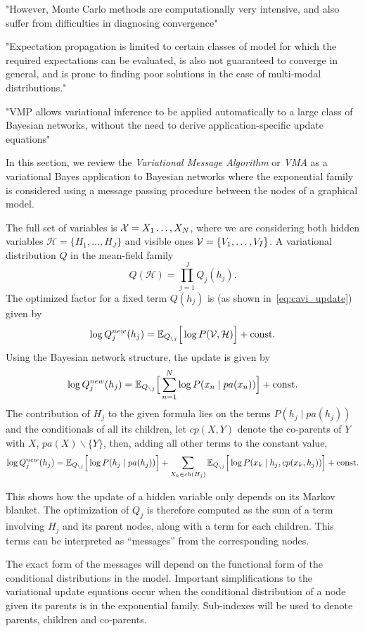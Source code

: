 
"However, Monte Carlo methods are computationally very intensive, and also suffer from difficulties in diagnosing convergence"

"Expectation propagation is limited to certain classes of model for which the required expectations can be evaluated, is also not guaranteed to converge in general, and is prone to finding poor solutions in the case of multi-modal distributions."

"VMP allows variational inference to be applied automatically to a large class of Bayesian networks, without the need to derive application-specific update equations"

In this section, we review the \emph{Variational Message Algorithm} or \emph{VMA} as a variational Bayes application to Bayesian networks where the exponential family is considered using a message passing procedure between the nodes of a graphical model. 

The full set of variables is \( \mathcal{X} = X_1\dots,X_N \), where we are considering both hidden variables \( \mathcal{H} = \{H_1,\dots,H_J\} \) and visible ones \( \mathcal{V} = \{V_{1}, \dots, V_{I}\}\). A variational distribution \( Q \) in the mean-field family
\[
   Q(\mathcal{H}) = \prod_{j=1}^J Q_{j}(h_j).
\] 
The optimized factor for a fixed term \(Q(h_{j})\) is (as shown in~\ref{eq:cavi_update}) given by
\[
   \log Q_{j}^{new}(h_j) = \mathbb{E}_{Q_{\backslash j}}\Big[\log P(\mathcal{V}, \mathcal{H})\Big] + \text{const.}
\]
Using the Bayesian network structure, the update is given by
\[
  \log Q_{j}^{new}(h_j) = \mathbb{E}_{Q_{\backslash j}}\Big[ \sum_{n=1}^N \log P(x_n \mid pa(x_n))\Big] + \text{const.}
\]
The contribution of \(H_{j}\) to the given formula lies on the terms \( P(h_j \mid pa(h_j)) \) and the conditionals of all its children, let \(cp(X,Y)\) denote the co-parents of \(Y\) with \(X\),  \(pa(X)\backslash \{Y\}\), then, adding all other terms to the constant value,
\[
   \log Q_{j}^{new}(h_j) = \mathbb{E}_{Q_{\backslash j}}\Big[\log P(h_j \mid pa(h_j))\Big] + \sum_{X_k \in ch(H_j)} \mathbb{E}_{Q_{\backslash j}}\Big[\log P(x_k \mid h_{j},cp(x_k, h_{j}))\Big] + \text{const.}
\]

This shows how the update of a hidden variable only depends on its Markov blanket. The optimization of \( Q_j \) is therefore computed as the sum of a term involving \( H_j \) and its parent nodes, along with a term for each children. This terms can be interpreted as ``messages'' from the corresponding nodes.

The exact form of the messages will depend on the functional form of the conditional distributions in the model. Important simplifications to the variational update equations occur when the conditional distribution of a node given its parents is in the exponential family. Sub-indexes will be used to denote parents, children and co-parents.

